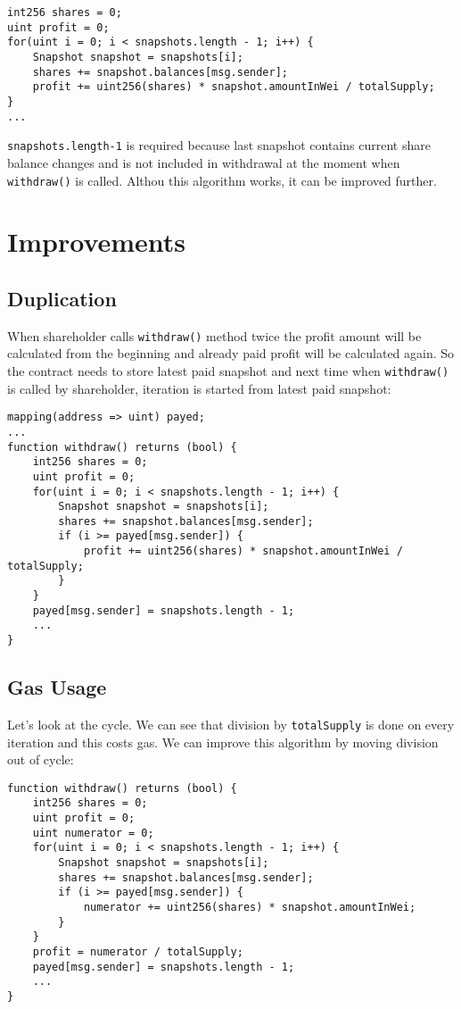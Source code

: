 \documentclass[onecolumn]{article}
\begin{document}
\begin{lstlisting}
int256 shares = 0;
uint profit = 0;
for(uint i = 0; i < snapshots.length - 1; i++) {
	Snapshot snapshot = snapshots[i];
	shares += snapshot.balances[msg.sender];
	profit += uint256(shares) * snapshot.amountInWei / totalSupply;
}
...
\end{lstlisting}
\lstinline{snapshots.length-1} is required because last snapshot contains current share balance changes and is not included in withdrawal at the moment when \lstinline{withdraw()} is called.
Althou this algorithm works, it can be improved further.

\section{Improvements}
\subsection{Duplication}
When shareholder calls \lstinline{withdraw()} method twice the profit amount will be calculated from the beginning and already paid profit will be calculated again. So the contract needs to store latest paid snapshot and next time when \lstinline{withdraw()} is called by shareholder, iteration is started from latest paid snapshot:
\begin{lstlisting}
mapping(address => uint) payed;
...
function withdraw() returns (bool) {
	int256 shares = 0;
	uint profit = 0;
	for(uint i = 0; i < snapshots.length - 1; i++) {
		Snapshot snapshot = snapshots[i];
		shares += snapshot.balances[msg.sender];
		if (i >= payed[msg.sender]) {
			profit += uint256(shares) * snapshot.amountInWei / totalSupply;
		}
	}
	payed[msg.sender] = snapshots.length - 1;
	...
}
\end{lstlisting}
\subsection{Gas Usage}
Let's look at the cycle. We can see that division by \lstinline{totalSupply} is done on every iteration and this costs gas. We can improve this algorithm by moving division out of cycle:
\begin{lstlisting}
function withdraw() returns (bool) {
	int256 shares = 0;
	uint profit = 0;
	uint numerator = 0;
	for(uint i = 0; i < snapshots.length - 1; i++) {
		Snapshot snapshot = snapshots[i];
		shares += snapshot.balances[msg.sender];
		if (i >= payed[msg.sender]) {
			numerator += uint256(shares) * snapshot.amountInWei;
		}
	}
	profit = numerator / totalSupply;
	payed[msg.sender] = snapshots.length - 1;
	...
}
\end{lstlisting}
\end{document}
